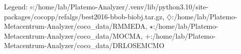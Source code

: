 Legend: {\color{CornflowerBlue}$\circ$}:/home/lab/Platemo-Analyzer/.venv/lib/python3.10/site-packages/cocopp/refalgs/best2016-bbob-biobj.tar.gz, {{}$\diamondsuit$}:/home/lab/Platemo-Metacentrum-Analyzer/coco\_data/RMMEDA, {\color{Green}$\star$}:/home/lab/Platemo-Metacentrum-Analyzer/coco\_data/MOCMA, {\color{red}+}:/home/lab/Platemo-Metacentrum-Analyzer/coco\_data/DRLOSEMCMO